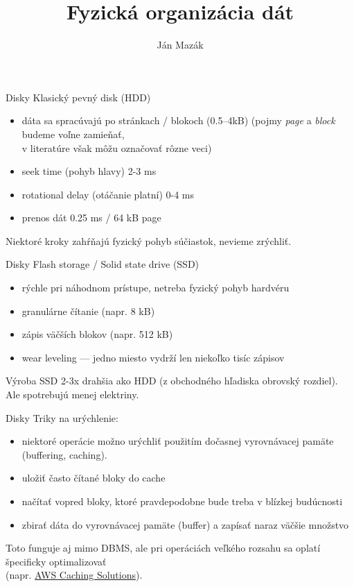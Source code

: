 \documentclass[12pt]{beamer}
\title{Fyzická organizácia dát}
\author{Ján Mazák}
\institute{FMFI UK Bratislava}
\date{}
\begin{document}
\frame{\titlepage}

\begin{frame}[fragile]{Disky}
Klasický pevný disk (HDD)
\begin{itemize}
\item dáta sa spracúvajú po stránkach / blokoch (0.5--4kB)
  (pojmy \emph{page} a \emph{block} budeme voľne zamieňať,\\ v literatúre však môžu označovať rôzne veci)
\item seek time (pohyb hlavy) 2-3 ms
\item rotational delay (otáčanie platní) 0-4 ms
\item prenos dát 0.25 ms / 64 kB page
\end{itemize}
Niektoré kroky zahŕňajú fyzický pohyb súčiastok, nevieme zrýchliť.\\
\end{frame}

\begin{frame}[fragile]{Disky}
Flash storage / Solid state drive (SSD)
\begin{itemize}
\item rýchle pri náhodnom prístupe, netreba fyzický pohyb hardvéru
\item granulárne čítanie (napr. 8 kB)
\item zápis väčších blokov (napr. 512 kB)
\item wear leveling --- jedno miesto vydrží len niekoľko tisíc zápisov
\end{itemize}
Výroba SSD 2-3x drahšia ako HDD (z obchodného hľadiska obrovský rozdiel).
Ale spotrebujú menej elektriny.
\end{frame}

\begin{frame}[fragile]{Disky}
Triky na urýchlenie:
\begin{itemize}
\item niektoré operácie možno urýchliť použitím dočasnej vyrovnávacej pamäte (buffering, caching).
\item uložiť často čítané bloky do cache
\item načítať vopred bloky, ktoré pravdepodobne bude treba v blízkej budúcnosti
\item zbirať dáta do vyrovnávacej pamäte (buffer) a zapísať naraz väčšie množstvo
\end{itemize}
Toto funguje aj mimo DBMS, ale pri operáciách veľkého rozsahu sa oplatí špecificky optimalizovať\\
(napr. \href{https://aws.amazon.com/caching/aws-caching/}{AWS Caching Solutions}).
\end{frame}
\end{document}
